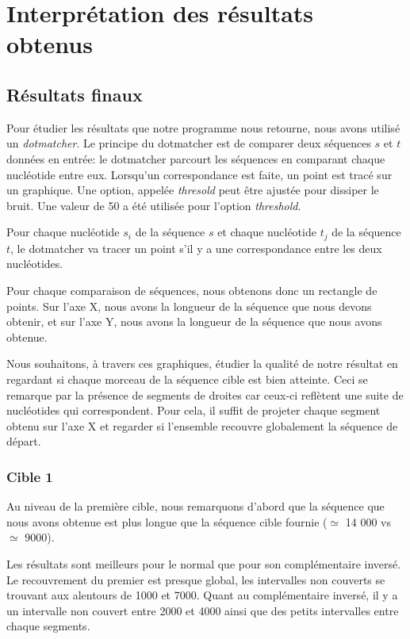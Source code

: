 
\section{Interprétation des résultats obtenus}

\subsection{Résultats finaux}

Pour étudier les résultats que notre programme nous retourne, nous avons utilisé
un \textit{dotmatcher}.
Le principe du dotmatcher est de comparer deux séquences $s$ et $t$ données en
entrée: le dotmatcher parcourt les séquences en comparant chaque nucléotide
entre eux.  Lorsqu'un correspondance est faite, un point est tracé sur un
graphique. Une option, appelée \textit{thresold} peut être ajustée pour dissiper
le bruit. Une valeur de 50 a été utilisée pour l'option \textit{threshold}.

Pour chaque nucléotide $s_{i}$ de la séquence $s$ et chaque nucléotide $t_{j}$
de la séquence $t$, le dotmatcher va tracer un point s'il y a une correspondance
entre les deux nucléotides.

Pour chaque comparaison de séquences, nous obtenons donc un rectangle de
points. Sur l'axe X, nous avons la longueur de la séquence que nous devons
obtenir, et sur l'axe Y, nous avons la longueur de la séquence que nous avons
obtenue.

Nous souhaitons, à travers ces graphiques, étudier la qualité de notre
résultat en regardant si chaque morceau de la séquence cible est bien
atteinte. Ceci se remarque par la présence de segments de droites car ceux-ci
reflètent une suite de nucléotides qui correspondent. Pour cela, il
suffit de projeter chaque segment obtenu sur l'axe X et regarder si l'ensemble
recouvre globalement la séquence de départ.

\subsubsection*{Cible 1}

Au niveau de la première cible, nous remarquons d'abord que la séquence que nous
avons obtenue est plus longue que la séquence cible fournie ($\simeq$ 14 000 vs
$\simeq$ 9000).

Les résultats sont meilleurs pour le normal que pour son complémentaire
inversé. Le recouvrement du premier est presque global, les intervalles non
couverts se trouvant aux alentours de 1000 et 7000. Quant au complémentaire
inversé, il y a un intervalle non couvert entre 2000 et 4000 ainsi que des
petits intervalles entre chaque segments.

